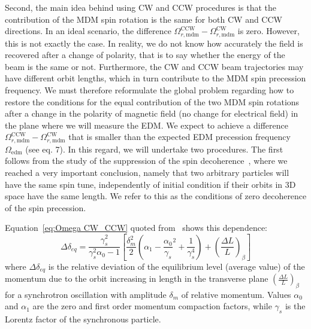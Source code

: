 \documentclass[a4paper]{jacow}
\begin{document}
Second, the main idea behind using CW and CCW procedures is that the contribution of the MDM spin rotation is the same for both CW and CCW directions. In an ideal scenario, the difference $\Omega_{r,\mathrm{mdm}}^{\mathrm{CCW}}-\Omega_{r,\mathrm{mdm}}^{\mathrm{CW}}$   is zero. However, this is not exactly the case. In reality, we do not know how accurately the field is recovered after a change of polarity, that is to say whether the energy of the beam is the same or not. Furthermore, the CW and CCW beam trajectories may  have different orbit lengths, which in turn contribute to the MDM spin precession frequency. We must therefore reformulate the global problem regarding how to restore the conditions for the equal contribution of the two MDM spin rotations after a change in the polarity of magnetic field (no change for electrical field) in the plane where we will measure the EDM. We expect to achieve a difference $\Omega_{r,\mathrm{mdm}}^{\mathrm{CCW}}-\Omega_{r,\mathrm{mdm}}^{\mathrm{CW}}$ that is smaller than the expected EDM precession frequency   $\Omega_{\mathrm{edm}}$ (see eq. 7). In this regard, we will undertake two procedures. The first follows from the study of the suppression of the spin decoherence~\cite{IPAC2013,decoherence}, where we reached a very important conclusion, namely that two arbitrary particles will have the same spin tune, independently of initial condition if their  orbits in 3D space have the same length. We refer to this as the conditions of zero decoherence of the spin precession.


 Equation~\eqref{eq:Omega CW_CCW} quoted from~\cite{IPAC2013} shows this dependence:
\begin{equation}\label{eq:delta p}
\Delta\delta_{eq}=\frac{\gamma_{s}^{2}}{\gamma_{s}^{2}\alpha_0-1}\left[\frac{\delta_{m}^{2}}{2}\left(\alpha_{1}-\frac{\alpha_{0}}{\gamma_{s}}^{2}+\frac{1}{\gamma_{s}^{4}}\right)+\left(\frac{\Delta L}{L}\right)_{\beta}\right]	
	\end{equation}
where $\Delta\delta_{eq}$  is the relative deviation of the equilibrium level (average value) of the momentum due to the orbit increasing in length in the transverse plane $\left(\frac{\Delta L}{L}\right)_{\beta}$   for a synchrotron oscillation with amplitude $\delta_{m}$ of relative momentum. Values $\alpha_{0}$ and $\alpha_{1}$  are the zero and first order momentum compaction factors, while $\gamma_{s}$  is the Lorentz factor of the synchronous particle. 
\end{document}
